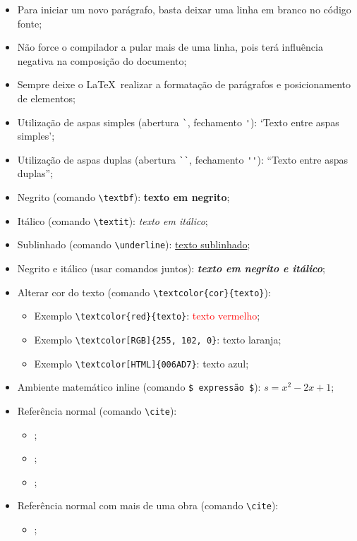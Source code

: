 \begin{itemize}
	\item Para iniciar um novo parágrafo, basta deixar uma linha em branco no código fonte;
	\item Não force o compilador a pular mais de uma linha, pois terá influência negativa na composição do documento;
	\item Sempre deixe o \LaTeX\ realizar a formatação de parágrafos e posicionamento de elementos;
	\item Utilização de aspas simples (abertura \verb|`|, fechamento \verb|'|): `Texto entre aspas simples';
	\item Utilização de aspas duplas (abertura \verb|``|, fechamento \verb|''|): ``Texto entre aspas duplas'';
	\item Negrito (comando \verb|\textbf|): \textbf{texto em negrito};
	\item Itálico (comando \verb|\textit|): \textit{texto em itálico};
	\item Sublinhado (comando \verb|\underline|): \underline{texto sublinhado};
	\item Negrito e itálico (usar comandos juntos): \textbf{\textit{texto em negrito e itálico}};
	\item Alterar cor do texto (comando \verb|\textcolor{cor}{texto}|):
	\begin{itemize}
		\item Exemplo \verb|\textcolor{red}{texto}|: \textcolor{red}{texto vermelho};
		\item Exemplo \verb|\textcolor[RGB]{255, 102, 0}|: \textcolor[RGB]{255, 102, 0}{texto laranja};
		\item Exemplo \verb|\textcolor[HTML]{006AD7}|: \textcolor[HTML]{006AD7}{texto azul};
	\end{itemize}
	\item Ambiente matemático inline (comando \verb|$ expressão $|): $s = x^2-2x +1$;
	\item Referência normal (comando \verb|\cite|):
	\begin{itemize}
		\item \cite{Agaisse1995};
		\item \cite{Abedi2014};
		\item \cite{Baum2016};
	\end{itemize}
	\item Referência normal com mais de uma obra (comando \verb|\cite|):
	\begin{itemize}
		\item \cite{Abedi2014, Agaisse1995};

\end{itemize}
\end{itemize}
